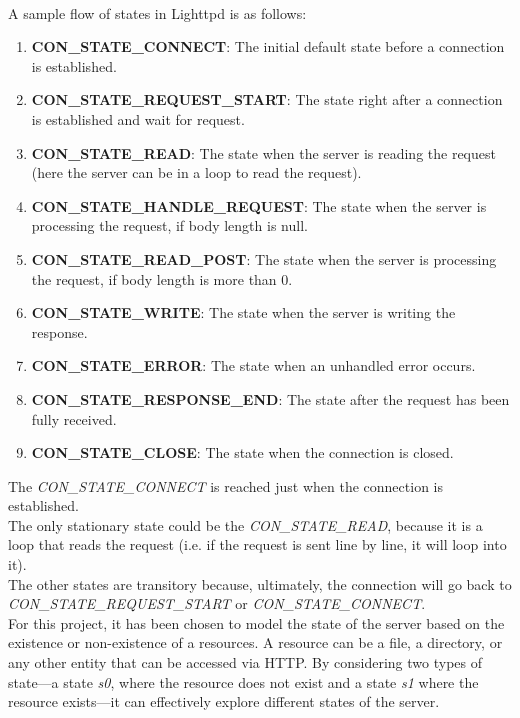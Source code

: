 \\A sample flow of states in Lighttpd is as follows:
\begin{enumerate}
    \item \textbf{CON\_STATE\_CONNECT}: The initial default state before a connection is established.
    
    \item \textbf{CON\_STATE\_REQUEST\_START}: The state right after a connection is established and wait for request.
    
    \item \textbf{CON\_STATE\_READ}: The state when the server is reading the request (here the server can be in a loop to read the request).
    
    \item \textbf{CON\_STATE\_HANDLE\_REQUEST}: The state when the server is processing the request, if body length is null.
    
    \item \textbf{CON\_STATE\_READ\_POST}: The state when the server is processing the request, if body length is more than 0.
    
    \item \textbf{CON\_STATE\_WRITE}: The state when the server is writing the response.
    \item \textbf{CON\_STATE\_ERROR}: The state when an unhandled error occurs.
    
    \item \textbf{CON\_STATE\_RESPONSE\_END}: The state after the request has been fully received.
    
    \item \textbf{CON\_STATE\_CLOSE}: The state when the connection is closed.
\end{enumerate}
The \textit{CON\_STATE\_CONNECT} is reached just when the connection is established.
\\The only stationary state could be the \textit{CON\_STATE\_READ}, because it is a loop that reads the request (i.e. if the request is sent line by line, it will loop into it).
\\The other states are transitory because, ultimately, the connection will go back to \textit{CON\_STATE\_REQUEST\_START} or \textit{CON\_STATE\_CONNECT}.
\\For this project, it has been chosen to model the state of the server based on the existence or non-existence of a resources. A resource can be a file, a directory, or any other entity that can be accessed via HTTP. By considering two types of state—a state \textit{s0}, where the resource does not exist and a state \textit{s1} where the resource exists—it can effectively explore different states of the server.

